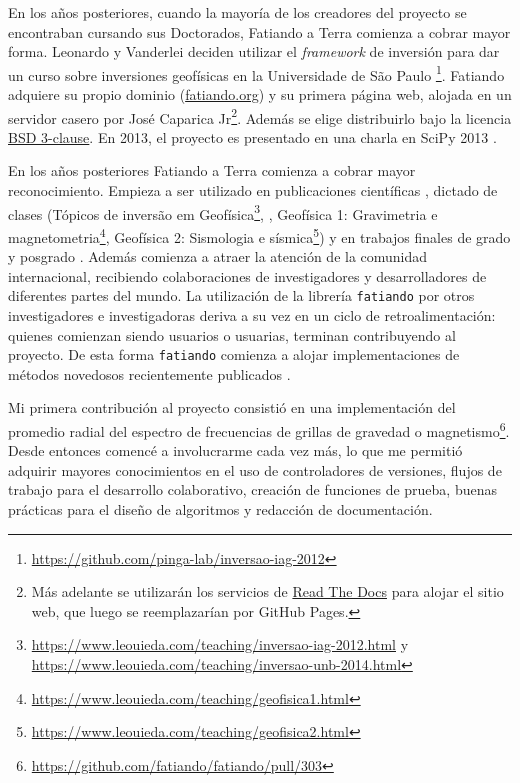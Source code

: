 En los años posteriores, cuando la mayoría de los creadores del proyecto se
encontraban cursando sus Doctorados, Fatiando a Terra comienza a cobrar mayor
forma.
Leonardo y Vanderlei deciden utilizar el \emph{framework} de inversión para dar
un curso sobre inversiones geofísicas en la Universidade de São Paulo%
\footnote{\url{https://github.com/pinga-lab/inversao-iag-2012}}.
Fatiando adquiere su propio dominio
(\href{https://www.fatiando.org}{fatiando.org}) y su primera página web,
alojada en un servidor casero por José Caparica Jr\footnote{%
    Más adelante se utilizarán los servicios de
    \href{https://readthedocs.org/}{Read The Docs} para alojar el sitio web,
    que luego se reemplazarían por GitHub Pages.
}.
Además se elige distribuirlo bajo la licencia
\href{https://opensource.org/licenses/BSD-3-Clause}{BSD 3-clause}.
En 2013, el proyecto es presentado en una charla en SciPy 2013
\citep{uieda2013}.

En los años posteriores Fatiando a Terra comienza a cobrar mayor
reconocimiento. Empieza a ser utilizado en publicaciones científicas
\citep[][entre otros]{%
    uieda2012,
    carlos2014,
    oliveira2015,
    hidalgogato2015,
    carlos2016,
    reis2016,
    uieda2017,
    hidalgogato2017,
    siqueira2017%
},
dictado de clases
(Tópicos de inversão em
Geofísica\footnote{%
    \url{https://www.leouieda.com/teaching/inversao-iag-2012.html}
    y \url{https://www.leouieda.com/teaching/inversao-unb-2014.html}
},
\citet{uieda2014},
Geofísica 1: Gravimetria e magnetometria\footnote{%
    \url{https://www.leouieda.com/teaching/geofisica1.html}
},
Geofísica 2: Sismologia e sísmica\footnote{%
    \url{https://www.leouieda.com/teaching/geofisica2.html}
})
y en trabajos finales de grado y posgrado
\citep{carlos2013, sales2014, soler2015, uieda2016b, melo2020}.
Además comienza a atraer la atención de la comunidad internacional, recibiendo
colaboraciones de investigadores y desarrolladores de diferentes partes del
mundo.
La utilización de la librería \texttt{fatiando} por otros investigadores
e investigadoras deriva a su vez en un ciclo de retroalimentación: quienes
comienzan siendo usuarios o usuarias, terminan contribuyendo al proyecto.
De esta forma \texttt{fatiando} comienza a alojar implementaciones de métodos
novedosos recientemente publicados \citep{uieda2012b, oliveira2013}.

Mi primera contribución al proyecto consistió en una implementación del promedio
radial del espectro de frecuencias de grillas de gravedad
o magnetismo\footnote{%
    \url{https://github.com/fatiando/fatiando/pull/303}
}.
Desde entonces comencé a involucrarme cada vez más, lo que me permitió adquirir
mayores conocimientos en el uso de controladores de versiones, flujos de
trabajo para el desarrollo colaborativo, creación de funciones de
prueba, buenas prácticas para el diseño de algoritmos y redacción de
documentación.

